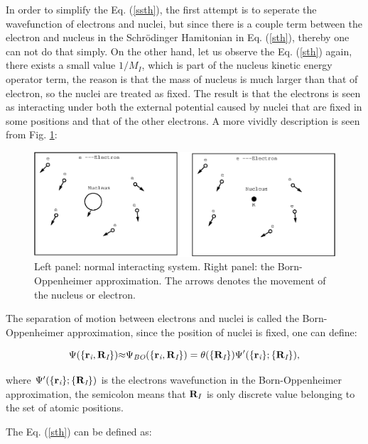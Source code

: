 \documentclass[a4paper, 12pt, titlepage,oneside,drop]{kthesis}
\begin{document}
\noindent In order to simplify the Eq.  (\ref{ssth}), the first attempt is to seperate the wavefunction of electrons and nuclei, but since there is a couple term between the electron and nucleus in the Schrödinger Hamitonian in Eq. (\ref{sth}), 
thereby one can not do that simply. On the other hand, let us observe the Eq. (\ref{sth}) again, there exists a small value ${1}/{M_I}$, which is part of the nucleus kinetic energy
operator term, the reason is that the mass of nucleus is much larger than that of electron, so the nuclei are treated as fixed. The result is that the electrons is seen as interacting under both the external potential caused by nuclei that are fixed in 
some positions and that of the other electrons. A more vividly description is seen from Fig. \ref{figbo}:
\begin{figure}[H]
\centering
\includegraphics[scale=.7]{system.eps}
\caption{Left panel: normal interacting system. Right panel: the Born-Oppenheimer approximation. The arrows denotes the movement of the nucleus or electron.}
\label{figbo}
\end{figure}

\noindent The separation of motion between electrons and nuclei is called the Born-Oppenheimer approximation, since the position of nuclei is fixed, one can define:

\begin{equation}\label{nwf}
{\Psi(\{ {\textbf r}_{\textit i}, {\textbf R}_{\textit I} \})}  {\approx}  {\Psi_{ \textit{BO}} ( \{ {\textbf{r}_{\textit{i}}},\textbf{R}_{\textit I} \}) } = {\theta(\{{\textbf R}_{\textit I}\})} {\Psi'(\{\textbf{r}_{\textit i}\}; \{{\textbf R}_{\textit I}\})},
\end{equation}


 \noindent where ${\Psi'(\{\textbf{r}_{\textit i}\}; \{{\textbf R}_{\textit I}\})}$  is the electrons wavefunction in the Born-Oppenheimer approximation, the semicolon means that $\textbf R_I$ is only discrete value belonging to the set of atomic positions. 
 
The Eq. (\ref{sth}) can be defined as:
\end{document}
